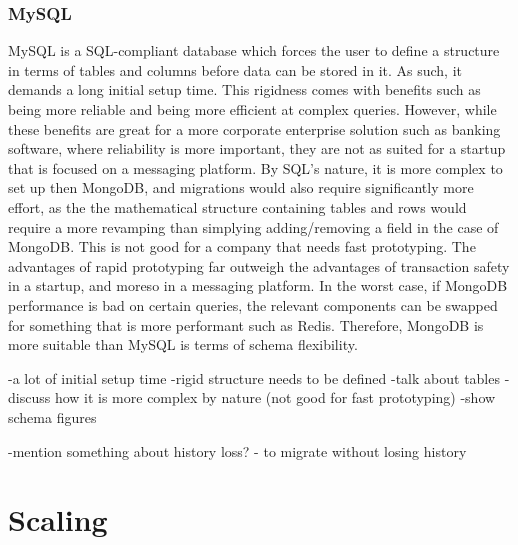 \documentclass[12pt]{article}
\begin{document}
\subsubsection{MySQL} %
MySQL is a SQL-compliant database which forces the user to define a structure in terms of tables and columns before data can be stored in it. As such, it demands a long initial setup time. This rigidness comes with benefits such as being more reliable and being more efficient at complex queries. However, while these benefits are great for a more corporate enterprise solution such as banking software, where reliability is more important, they are not as suited for a startup that is focused on a messaging platform. By SQL's nature, it is more complex to set up then MongoDB, and migrations would also require significantly more effort, as the the mathematical structure containing tables and rows would require a more revamping than simplying adding/removing a field in the case of MongoDB. This is not good for a company that needs fast prototyping. The advantages of rapid prototyping far outweigh the advantages of transaction safety in a startup, and moreso in a messaging platform. In the worst case, if MongoDB performance is bad on certain queries, the relevant components can be swapped for something that is more performant such as Redis. Therefore, MongoDB is more suitable than MySQL is terms of schema flexibility.

-a lot of initial setup time
-rigid structure needs to be defined
-talk about tables
-discuss how it is more complex by nature (not good for fast prototyping)
-show schema figures

-mention something about history loss? - to migrate without losing history

\section{Scaling}
\end{document}
